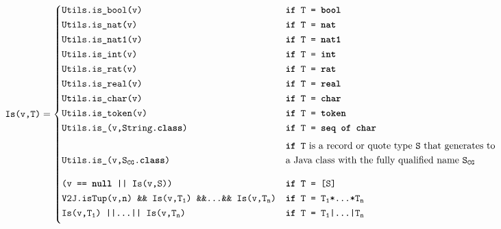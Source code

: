 \begin{figure*}[ht]
  \tiny
\begin{mdframed}
\begin{equation*}
\texttt{Is(v,T)} =
\begin{cases}
  \texttt{Utils.is\_bool(v)} & \kw{if} \texttt{ T = \kw{bool}}\\[\caseSpace]

  \texttt{Utils.is\_nat(v)} & \kw{if} \texttt{ T = \kw{nat}}\\[\caseSpace]

  \texttt{Utils.is\_nat1(v)} & \kw{if} \texttt{ T = \kw{nat1}}\\[\caseSpace]

  \texttt{Utils.is\_int(v)} & \kw{if} \texttt{ T = \kw{int}}\\[\caseSpace]

  \texttt{Utils.is\_rat(v)} & \kw{if} \texttt{ T = \kw{rat}}\\[\caseSpace]

  \texttt{Utils.is\_real(v)} & \kw{if} \texttt{ T = \kw{real}}\\[\caseSpace]

  \texttt{Utils.is\_char(v)} & \kw{if} \texttt{ T = \kw{char}}\\[\caseSpace]

  \texttt{Utils.is\_token(v)} & \kw{if} \texttt{ T = \kw{token}}\\[\caseSpace]

  \texttt{Utils.is\_(v,String.\kw{class})} & \kw{if} \texttt{ T = \kw{seq of char}}\\[6.0\caseSpace]

  \texttt{Utils.is\_(v,S\sub{CG}.\kw{class})} &
  \!\begin{aligned}[b]
    & \kw{if} \texttt{ T} \text{ is a record or quote type } \texttt{S} \text{ that generates to}\\
    & \text{a Java class with the fully qualified name } \texttt{S\sub{CG}}
    \end{aligned}\\[10.0\caseSpace]

  \texttt{(v == \kw{null} || Is(v,S))} & \kw{if} \texttt{ T = [S]}\\[\caseSpace]

  \texttt{V2J.isTup(v,n) \&\& Is(v,T\sub{1}) \&\&...\&\& Is(v,T\sub{n})} & \kw{if} \texttt{ T = T\sub{1}*...*T\sub{n}}\\[\caseSpace]

  \texttt{Is(v,T\sub{1}) ||...|| Is(v,T\sub{n})} & \kw{if} \texttt{ T = T\sub{1}|...|T\sub{n}}\\[6.0\caseSpace]


\end{cases}
\end{equation*}
\end{mdframed}
\end{figure*}
